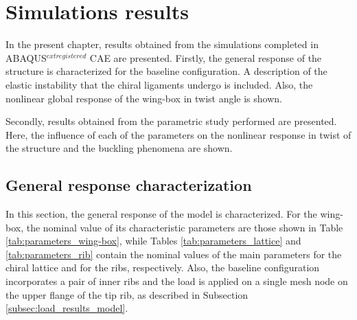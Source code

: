\chapter{Simulations results} \label{chap:results_sim}
  
  In the present chapter, results obtained from the simulations completed in ABAQUS$^{	extregistered}$ CAE are presented. Firstly, the general response of the structure is characterized for the baseline configuration. A description of the elastic instability that the chiral ligaments undergo is included. Also, the nonlinear global response of the wing-box in twist angle is shown.

  Secondly, results obtained from the parametric study performed are presented. Here, the influence of each of the parameters on the nonlinear response in twist of the structure and the buckling phenomena are shown.

\section{General response characterization} \label{sec:generalResponseCharact_results_sim}

  In this section, the general response of the model is characterized. For the wing-box, the nominal value of its characteristic parameters are those shown in Table \ref{tab:parameters_wing-box}, while Tables \ref{tab:parameters_lattice} and \ref{tab:parameters_rib} contain the nominal values of the main parameters for the chiral lattice and for the ribs, respectively. Also, the baseline configuration incorporates a pair of inner ribs and the load is applied on a single mesh node on the upper flange of the tip rib, as described in Subsection \ref{subsec:load_results_model}.

